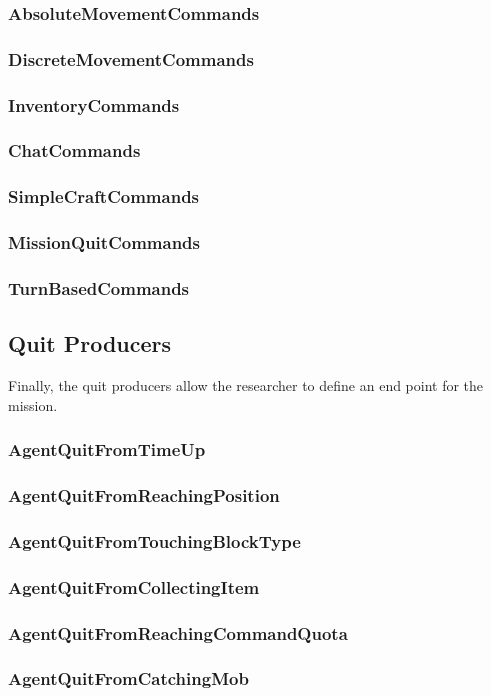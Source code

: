 \documentclass[11pt]{article} %
\begin{document}
\subsubsection{AbsoluteMovementCommands}
\subsubsection{DiscreteMovementCommands}
\subsubsection{InventoryCommands}
\subsubsection{ChatCommands}
\subsubsection{SimpleCraftCommands}
\subsubsection{MissionQuitCommands}
\subsubsection{TurnBasedCommands}

\subsection{Quit Producers}
Finally, the quit producers allow the researcher to define an end point for the mission.
\subsubsection{AgentQuitFromTimeUp}
\subsubsection{AgentQuitFromReachingPosition}
\subsubsection{AgentQuitFromTouchingBlockType}
\subsubsection{AgentQuitFromCollectingItem}
\subsubsection{AgentQuitFromReachingCommandQuota}
\subsubsection{AgentQuitFromCatchingMob}
\end{document}

